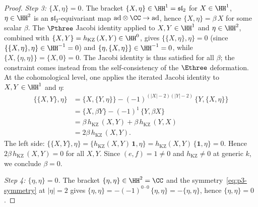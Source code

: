 \begin{proof}
\textit{Step 3: $\{X, \eta\} = 0$.}
The bracket $\{X, \eta\} \in \HH^1 = \mathfrak{sl}_2$
for $X \in \HH^1$, $\eta \in \HH^2$ is an
$\mathfrak{sl}_2$-equivariant map
$\mathrm{ad} \otimes \CC \to \mathrm{ad}$,
hence $\{X, \eta\} = \beta\,X$ for some scalar $\beta$.
The $\Pthree$ Jacobi identity applied to
$X, Y \in \HH^1$ and $\eta \in \HH^2$,
combined with
$\{X, Y\} = h_{\mathrm{KZ}}\,(X, Y) \in \HH^0$, gives
$\{\{X, \eta\}, \eta\} = 0$ (since
$\{\{X, \eta\}, \eta\} \in \HH^{-1} = 0$) and
$\{\eta, \{X, \eta\}\} \in \HH^{-1} = 0$,
while $\{X, \{\eta, \eta\}\} = \{X, 0\} = 0$.
The Jacobi identity is thus satisfied for all $\beta$;
the constraint comes instead from the self-consistency
of the $\Ethree$ deformation.
At the cohomological level, one applies the iterated Jacobi
identity to $X, Y \in \HH^1$ and $\eta$:
\begin{align*}
  \{\{X, Y\}, \eta\}
  &= \{X, \{Y, \eta\}\}
  - (-1)^{(|X|-2)(|Y|-2)}\,\{Y, \{X, \eta\}\} \\
  &= \{X, \beta Y\} - (-1)^1\,\{Y, \beta X\} \\
  &= \beta\,h_{\mathrm{KZ}}\,(X, Y)
  + \beta\,h_{\mathrm{KZ}}\,(Y, X) \\
  &= 2\beta\,h_{\mathrm{KZ}}\,(X, Y).
\end{align*}
The left side:
$\{\{X, Y\}, \eta\}
= \{h_{\mathrm{KZ}}(X, Y)\,\mathbf{1}, \eta\}
= h_{\mathrm{KZ}}(X, Y)\,\{\mathbf{1}, \eta\} = 0$.
Hence $2\beta\,h_{\mathrm{KZ}}\,(X, Y) = 0$ for all
$X, Y$. Since
$(e, f) = 1 \neq 0$ and $h_{\mathrm{KZ}} \neq 0$ at
generic $k$, we conclude $\beta = 0$.

\textit{Step 4: $\{\eta, \eta\} = 0$.}
The bracket $\{\eta, \eta\} \in \HH^2 = \CC$ and
the symmetry~\eqref{eq:p3-symmetry} at
$|\eta| = 2$ gives
$\{\eta, \eta\} = -(-1)^{0 \cdot 0}\,\{\eta, \eta\}
= -\{\eta, \eta\}$, hence $\{\eta, \eta\} = 0$.
\end{proof}

